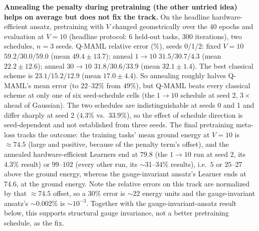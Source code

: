\documentclass[11pt]{article}
\begin{document}
\begin{keyresult}
\textbf{Annealing the penalty during pretraining (the other untried idea) helps on average but does not fix
the track.} On the headline hardware-efficient ansatz, pretraining with $V$ changed geometrically over the 40
epochs and evaluation at $V{=}10$ (headline protocol: 6 held-out tasks, 300 iterations), two schedules,
$n{=}3$ seeds. Q-MAML relative error (\%), seeds 0/1/2: fixed $V{=}10$ $59.2/30.0/59.0$ (mean $49.4\pm13.7$);
anneal $1\to10$ $31.5/30.7/\mathbf{4.3}$ (mean $22.2\pm12.6$); anneal $30\to10$ $31.8/30.6/33.9$ (mean
$32.1\pm1.4$). The best classical scheme is $23.1/15.2/12.9$ (mean $17.0\pm4.4$). So annealing roughly halves
Q-MAML's mean error (to $22$--$32\%$ from $49\%$), but Q-MAML beats every classical scheme at only one of
six seed-schedule cells (the $1\to10$ schedule at seed 2, $3\times$ ahead of Gaussian). The two schedules
are indistinguishable at seeds 0 and 1 and differ sharply at seed 2 ($4.3\%$ vs.\ $33.9\%$), so the effect of
schedule direction is seed-dependent and not established from three seeds. The final pretraining meta-loss
tracks the outcome: the training tasks' mean ground energy at $V{=}10$ is $\approx74.5$ (large and positive,
because of the penalty term's offset), and the annealed hardware-efficient Learners end at $79.8$ (the $1\to10$
run at seed 2, its $4.3\%$ result) or $99$--$102$ (every other run, its $\sim$31--34\% results), i.e.\ $5$ or
$25$--$27$ above the ground energy, whereas the gauge-invariant ansatz's Learner ends at $74.6$, at the ground
energy. Note the relative errors on this track are normalized by that $\approx74.5$ offset, so a $30\%$ error
is $\sim$22 energy units and the gauge-invariant ansatz's $\sim$0.002\% is $\sim$$10^{-3}$. Together with the
gauge-invariant-ansatz result below, this supports structural gauge invariance, not a better pretraining
schedule, as the fix.
\end{keyresult}
\end{document}
